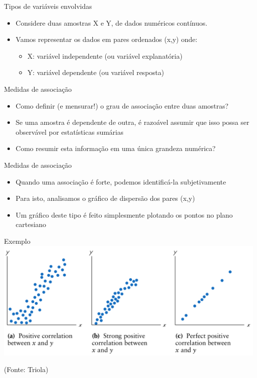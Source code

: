 \documentclass{beamer}
\begin{document}
\begin{frame}{Tipos de variáveis envolvidas}
  \begin{itemize}
  \item Considere duas amostras X e Y, de dados numéricos contínuos.
  \item Vamos representar os dados em pares ordenados (x,y) onde:
    \begin{itemize}
    \item X: variável independente (ou variável explanatória)
    \item Y: variável dependente (ou variável resposta)
    \end{itemize}
  \end{itemize}
\end{frame}

\begin{frame}{Medidas de associação}
  \begin{itemize}
  \item Como definir (e mensurar!) o grau de associação entre duas amostras?
  \item Se uma amostra é dependente de outra, é razoável assumir que isso
    possa ser observável por estatísticas sumárias
  \item Como resumir esta informação em uma única grandeza numérica?
  \end{itemize}
\end{frame}

\begin{frame}{Medidas de associação}
  \begin{itemize}
  \item Quando uma associação é forte, podemos identificá-la
    subjetivamente
  \item Para isto, analisamos o gráfico de dispersão dos pares (x,y)
  \item Um gráfico deste tipo é feito simplesmente plotando os pontos
    no plano cartesiano
  \end{itemize}
\end{frame}

\begin{frame}{Exemplo}
  \includegraphics[height=0.6\textheight]{Cap17/positive}

  (Fonte: Triola)
\end{frame}
\end{document}
